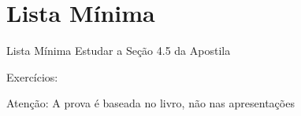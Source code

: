 \documentclass[fleqn,utf8,aspectratio=169,12pt]{beamer}
\begin{document}
\section{Lista Mínima}

\begin{frame}{Lista Mínima}
  Estudar a Seção 4.5 da Apostila

  Exercícios:

  \vfill
  Atenção: A prova é baseada no livro, não nas apresentações
\end{frame}

\end{document}
